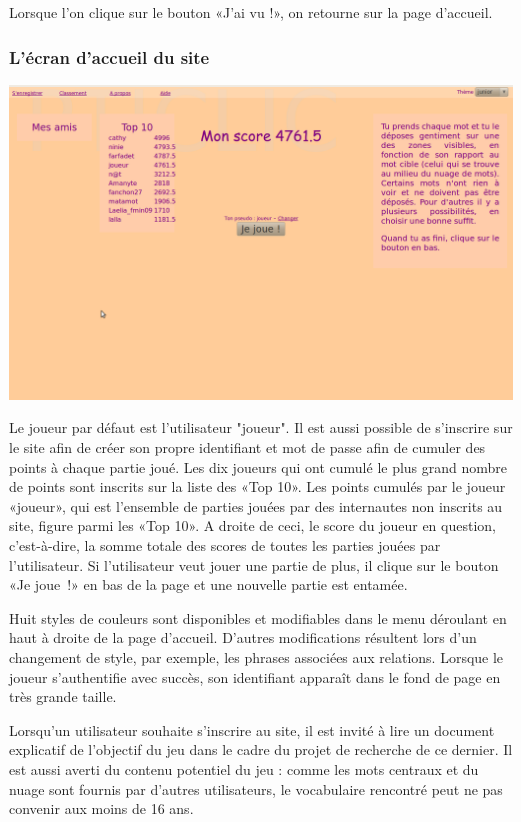 \documentclass[a4paper,11pt,french]{article}
\begin{document}
Lorsque l'on clique sur le bouton «J'ai vu !», on retourne sur la page d'accueil.

\subsubsection{L'écran d'accueil du site}
\begin{center}
\includegraphics[width=14cm]{img/PtiClicAccueil.png}
\end{center}

Le joueur par défaut est l'utilisateur "joueur". Il est aussi possible de s'inscrire sur le site afin de créer son propre identifiant et mot
de passe afin de cumuler des points à chaque partie joué. Les dix joueurs qui ont cumulé le plus grand nombre de points sont inscrits sur la
liste des «Top 10». Les points cumulés par le joueur «joueur», qui est l'ensemble de parties jouées par des internautes non inscrits au
site, figure parmi les «Top 10». A droite de ceci, le score du joueur en question, c'est-à-dire, la somme totale des scores de toutes les
parties jouées par l'utilisateur. Si l'utilisateur veut jouer une partie de plus, il clique sur le bouton «Je joue~!» en bas de la page et
une nouvelle partie est entamée.

Huit styles de couleurs sont disponibles et modifiables dans le menu déroulant en haut à droite de la page d'accueil. D'autres modifications résultent lors d'un changement de style, par exemple, les phrases associées aux relations. Lorsque le joueur s'authentifie avec succès, son identifiant apparaît dans le fond de page en très grande taille.

Lorsqu'un utilisateur souhaite s'inscrire au site, il est invité à lire un document explicatif de l'objectif du jeu dans le cadre du projet
de recherche de ce dernier. Il est aussi averti du contenu potentiel du jeu : comme les mots centraux et du nuage sont fournis par d'autres
utilisateurs, le vocabulaire rencontré peut ne pas convenir aux moins de 16 ans.
\end{document}
